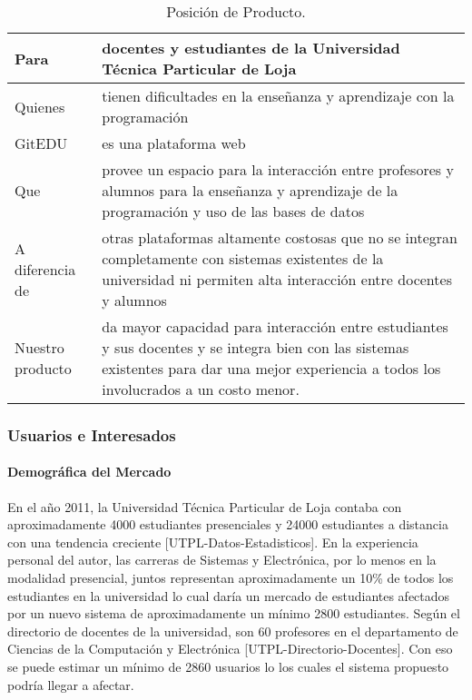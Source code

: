 \begin{table}[h!]
  \begin{tabular}{|p{}|p{}|}
    \hline
    Para & docentes y estudiantes de la Universidad Técnica Particular de Loja \\
    \hline
    Quienes & tienen dificultades en la enseñanza y aprendizaje con la programación \\
    \hline
    GitEDU & es una plataforma web \\
    \hline
    Que & provee un espacio para la interacción entre profesores y alumnos para la enseñanza y aprendizaje de la programación y uso de las bases de datos \\
    \hline
    A diferencia de & otras plataformas altamente costosas que no se integran completamente con sistemas existentes de la universidad ni permiten alta interacción entre docentes y alumnos \\
    \hline
    Nuestro producto & da mayor capacidad para interacción entre estudiantes y sus docentes y se integra bien con las sistemas existentes para dar una mejor experiencia a todos los involucrados a un costo menor. \\
    \hline
  \end{tabular}
  \caption{Posición de Producto.}
  \label{pos-prod}
\end{table}

\pagebreak

\subsubsection{Usuarios e Interesados}
\paragraph{Demográfica del Mercado}
En el año 2011, la Universidad Técnica Particular de Loja contaba con aproximadamente 4000 estudiantes presenciales y 24000 estudiantes a distancia con una tendencia creciente [UTPL-Datos-Estadisticos]. En la experiencia personal del autor, las carreras de Sistemas y Electrónica, por lo menos en la modalidad presencial, juntos representan aproximadamente un 10\% de todos los estudiantes en la universidad lo cual daría un mercado de estudiantes afectados por un nuevo sistema de aproximadamente un mínimo 2800 estudiantes. Según el directorio de docentes de la universidad, son 60 profesores en el departamento de Ciencias de la Computación y Electrónica [UTPL-Directorio-Docentes]. Con eso se puede estimar un mínimo de 2860 usuarios lo los cuales el sistema propuesto podría llegar a afectar.

